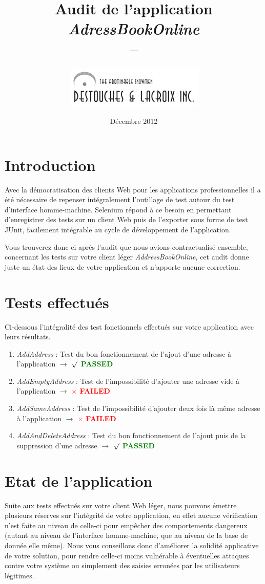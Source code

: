 \documentclass{article}
\title{Audit de l'application \textit{AdressBookOnline} \\ --}
\author{   \includegraphics{UberLogo}}
\date{Décembre 2012}
\begin{document}
\begin{titlepage}
\pagestyle{fancy}

  	\maketitle
  	\tableofcontents
\end{titlepage}

\newpage
\section{Introduction}
Avec la démocratisation des clients Web pour les applications professionnelles il a été nécessaire de repenser intégralement l'outillage de test autour du test d'interface homme-machine. Selenium répond à ce besoin en permettant d'enregistrer des tests sur un client Web puis de l'exporter sous forme de test JUnit, facilement intégrable au cycle de développement de l'application.

Vous trouverez donc ci-après l'audit que nous avions contractualisé ensemble, concernant les tests sur votre client léger \textit{AddressBookOnline}, cet audit donne juste un état des lieux de votre application et n'apporte aucune correction.


\section{Tests effectués}
Ci-dessous l'intégralité des test fonctionnels effectués sur votre application avec leurs résultats.

\begin{enumerate}
\item \textit{AddAddress} : Test du bon fonctionnement de l'ajout d'une adresse à l'application $\rightarrow$ \textbf{\textcolor{green}{$\surd$ PASSED}}
\item \textit{AddEmptyAddress} : Test de l'impossibilité d'ajouter une adresse vide à l'application $\rightarrow$ \textbf{\textcolor{red}{$\times$ FAILED}}
\item \textit{AddSameAddress} : Test de l'impossibilité d'ajouter deux fois là même adresse à l'application $\rightarrow$ \textbf{\textcolor{red}{$\times$ FAILED}}
\item \textit{AddAndDeleteAddress} :  Test du bon fonctionnement de l'ajout puis de la suppression d'une adresse $\rightarrow$ \textbf{\textcolor{green}{$\surd$ PASSED}}
\end{enumerate}

\section{Etat de l'application}
Suite aux tests effectués sur votre client Web léger, nous pouvons émettre plusieurs réserves sur l’intégrité de votre application, en effet aucune vérification n’est faite au niveau de celle-ci pour empêcher des comportements dangereux (autant au niveau de l’interface homme-machine, que au niveau de la base de donnée elle même). Nous vous conseillons donc d'améliorer la solidité applicative de votre solution, pour rendre celle-ci moins vulnérable à éventuelles attaques contre votre système ou simplement des saisies erronées par les utilisateurs légitimes.
\end{document}
